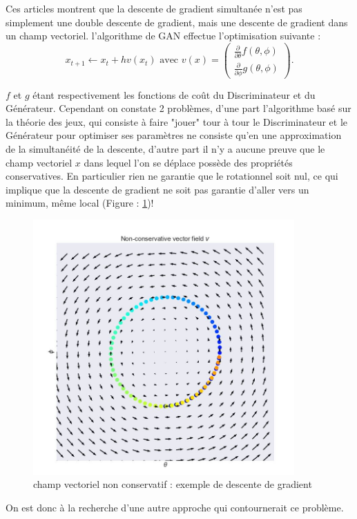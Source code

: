 Ces articles montrent que la descente de gradient simultanée n'est pas simplement une double descente de gradient, mais une descente de gradient dans un champ vectoriel. l'algorithme de GAN effectue l'optimisation suivante : 
\[x_{t+1} \leftarrow x_t + h v(x_t) \text{ avec } v(x) = \left(\begin{matrix}\frac{\partial}{\partial\theta}f(\theta, \phi)\\\frac{\partial}{\partial\phi}g(\theta, \phi)\end{matrix}\right).\]

$f$ et $g$ étant respectivement les fonctions de coût du Discriminateur et du Générateur. Cependant on constate 2 problèmes, d'une part l'algorithme basé sur la théorie des jeux, qui consiste à faire "jouer" tour à tour le Discriminateur et le Générateur pour optimiser ses paramètres ne consiste qu'en une approximation de la simultanéité de la descente, d'autre part il n'y a aucune preuve que le champ vectoriel $x$ dans lequel l'on se déplace possède des propriétés conservatives. En particulier rien ne garantie que le rotationnel soit nul, ce qui implique que la descente de gradient ne soit pas garantie d'aller vers un minimum, même local (Figure : \ref{fig:vector_field})!

\begin{figure}[ht!]
  \centering
    \includegraphics[width=10cm]{fig/vector_field}
    \caption{champ vectoriel non conservatif : exemple de descente de gradient}
    \label{fig:vector_field}
\end{figure}

On est donc à la recherche d'une autre approche qui contournerait ce problème.



